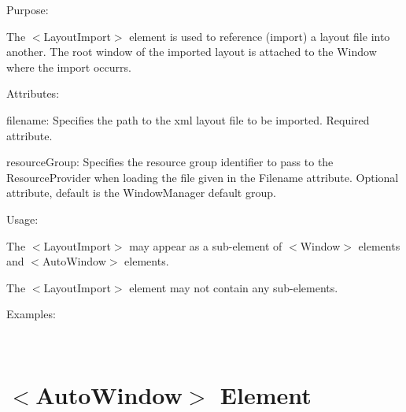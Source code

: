 \begin{DoxyItemize}
\item Purpose\+:
\begin{DoxyItemize}
\item The $<$Layout\+Import$>$ element is used to reference (import) a layout file into another. The root window of the imported layout is attached to the Window where the import occurrs.
\end{DoxyItemize}
\item Attributes\+:
\begin{DoxyItemize}
\item {\ttfamily filename\+:} Specifies the path to the xml layout file to be imported. Required attribute.
\item {\ttfamily resource\+Group\+:} Specifies the resource group identifier to pass to the Resource\+Provider when loading the file given in the {\ttfamily Filename} attribute. Optional attribute, default is the Window\+Manager default group.
\end{DoxyItemize}
\item Usage\+:
\begin{DoxyItemize}
\item The $<$Layout\+Import$>$ may appear as a sub-\/element of $<$Window$>$ elements and $<$Auto\+Window$>$ elements.
\item The $<$Layout\+Import$>$ element may not contain any sub-\/elements.
\end{DoxyItemize}
\item Examples\+:
\end{DoxyItemize}

~\newline
 \hypertarget{xml_layout_xml_layout_autowindow}{}\section{$<$\+Auto\+Window$>$ Element}\label{xml_layout_xml_layout_autowindow}

